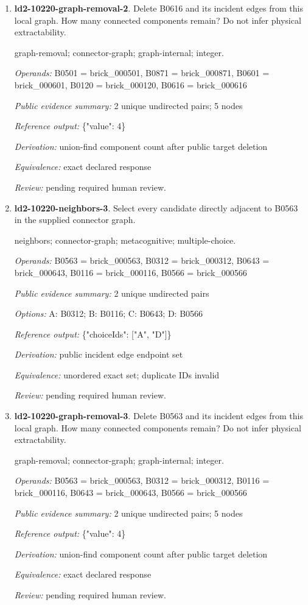 \begin{enumerate}
\item \textbf{ld2-10220-graph-removal-2}. Delete B0616 and its incident edges from this local graph. How many connected components remain? Do not infer physical extractability.
\par{\small graph-removal; connector-graph; graph-internal; integer.\par\textit{Operands:} B0501 = brick\_000501, B0871 = brick\_000871, B0601 = brick\_000601, B0120 = brick\_000120, B0616 = brick\_000616\par\textit{Public evidence summary:} 2 unique undirected pairs; 5 nodes\par\textit{Reference output:} \{"value": 4\}\par\textit{Derivation:} union-find component count after public target deletion\par\textit{Equivalence:} exact declared response\par\textit{Review:} pending required human review.}
\item \textbf{ld2-10220-neighbors-3}. Select every candidate directly adjacent to B0563 in the supplied connector graph.
\par{\small neighbors; connector-graph; metacognitive; multiple-choice.\par\textit{Operands:} B0563 = brick\_000563, B0312 = brick\_000312, B0643 = brick\_000643, B0116 = brick\_000116, B0566 = brick\_000566\par\textit{Public evidence summary:} 2 unique undirected pairs\par\textit{Options:} A: B0312; B: B0116; C: B0643; D: B0566\par\textit{Reference output:} \{"choiceIds": ["A", "D"]\}\par\textit{Derivation:} public incident edge endpoint set\par\textit{Equivalence:} unordered exact set; duplicate IDs invalid\par\textit{Review:} pending required human review.}
\item \textbf{ld2-10220-graph-removal-3}. Delete B0563 and its incident edges from this local graph. How many connected components remain? Do not infer physical extractability.
\par{\small graph-removal; connector-graph; graph-internal; integer.\par\textit{Operands:} B0563 = brick\_000563, B0312 = brick\_000312, B0116 = brick\_000116, B0643 = brick\_000643, B0566 = brick\_000566\par\textit{Public evidence summary:} 2 unique undirected pairs; 5 nodes\par\textit{Reference output:} \{"value": 4\}\par\textit{Derivation:} union-find component count after public target deletion\par\textit{Equivalence:} exact declared response\par\textit{Review:} pending required human review.}

\end{enumerate}
